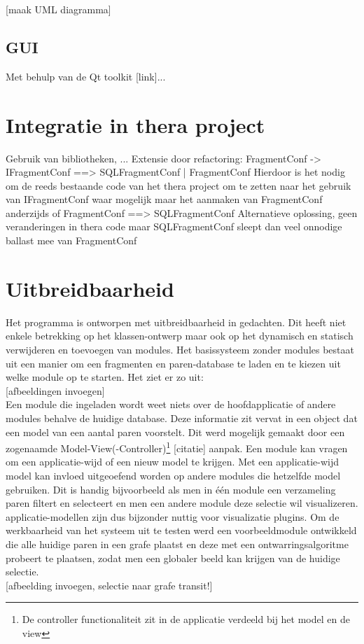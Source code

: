 [maak UML diagramma]\\

\subsection{GUI}
Met behulp van de Qt toolkit [link]...

\section{Integratie in thera project}
Gebruik van bibliotheken, ...
Extensie door refactoring: FragmentConf -> IFragmentConf ==> SQLFragmentConf | FragmentConf
Hierdoor is het nodig om de reeds bestaande code van het thera project om te zetten naar het gebruik van IFragmentConf waar mogelijk maar het aanmaken van FragmentConf anderzijds
of FragmentConf ==> SQLFragmentConf
Alternatieve oplossing, geen veranderingen in thera code maar SQLFragmentConf sleept dan veel onnodige ballast mee van FragmentConf

\section{Uitbreidbaarheid}
Het programma is ontworpen met uitbreidbaarheid in gedachten. Dit heeft niet enkele betrekking op het klassen-ontwerp maar ook op het dynamisch en statisch verwijderen en toevoegen van modules. Het basissysteem
zonder modules bestaat uit een manier om een fragmenten en paren-database te laden en te kiezen uit welke module op te starten. Het ziet er zo uit: \\

[afbeeldingen invoegen]\\

Een module die ingeladen wordt weet niets over de hoofdapplicatie of andere modules behalve de huidige database. Deze informatie zit vervat in een object dat een model van een aantal paren voorstelt. Dit werd mogelijk gemaakt door een zogenaamde Model-View(-Controller)\footnote{De controller functionaliteit zit in de applicatie verdeeld bij het model en de view} [citatie] aanpak. Een module kan vragen om een applicatie-wijd of een nieuw model te krijgen. Met een applicatie-wijd model kan invloed uitgeoefend worden op andere modules die hetzelfde model gebruiken. Dit is handig bijvoorbeeld als men in \'e\'en module een verzameling paren filtert en selecteert en men een andere module deze selectie wil visualizeren. applicatie-modellen zijn dus bijzonder nuttig voor visualizatie plugins. Om de werkbaarheid van het systeem uit te testen werd een voorbeeldmodule ontwikkeld die alle huidige paren in een grafe plaatst en deze met een ontwarringsalgoritme probeert te plaatsen, zodat men een globaler beeld kan krijgen van de huidige selectie.\\

[afbeelding invoegen, selectie naar grafe transit!]\\